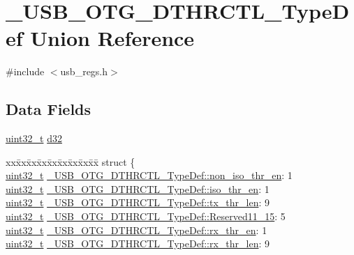\hypertarget{union___u_s_b___o_t_g___d_t_h_r_c_t_l___type_def}{\section{\-\_\-\-U\-S\-B\-\_\-\-O\-T\-G\-\_\-\-D\-T\-H\-R\-C\-T\-L\-\_\-\-Type\-Def Union Reference}
\label{union___u_s_b___o_t_g___d_t_h_r_c_t_l___type_def}
}


{\ttfamily \#include $<$usb\-\_\-regs.\-h$>$}

\subsection*{Data Fields}
\begin{DoxyCompactItemize}
\item 
\hyperlink{stdint_8h_a435d1572bf3f880d55459d9805097f62}{uint32\-\_\-t} \hyperlink{group___u_s_b___o_t_g___d_r_i_v_e_r_ga4c8322898391b3df3f8c2eaaaa831cd6}{d32}
\item 
\begin{tabbing}
xx\=xx\=xx\=xx\=xx\=xx\=xx\=xx\=xx\=\kill
struct \{\\
\>\hyperlink{stdint_8h_a435d1572bf3f880d55459d9805097f62}{uint32\_t} \hyperlink{group___u_s_b___o_t_g___d_r_i_v_e_r_ga437a4ecc78a29535cb600a64f99fdded}{\_USB\_OTG\_DTHRCTL\_TypeDef::non\_iso\_thr\_en}: 1\\
\>\hyperlink{stdint_8h_a435d1572bf3f880d55459d9805097f62}{uint32\_t} \hyperlink{group___u_s_b___o_t_g___d_r_i_v_e_r_ga061c382bbfc6cb270dd9074511b6546b}{\_USB\_OTG\_DTHRCTL\_TypeDef::iso\_thr\_en}: 1\\
\>\hyperlink{stdint_8h_a435d1572bf3f880d55459d9805097f62}{uint32\_t} \hyperlink{group___u_s_b___o_t_g___d_r_i_v_e_r_ga567c6393ecd2b93a7bb261d16f56543a}{\_USB\_OTG\_DTHRCTL\_TypeDef::tx\_thr\_len}: 9\\
\>\hyperlink{stdint_8h_a435d1572bf3f880d55459d9805097f62}{uint32\_t} \hyperlink{group___u_s_b___o_t_g___d_r_i_v_e_r_gaf4fce312a08ead77b5fe741fcff35b5d}{\_USB\_OTG\_DTHRCTL\_TypeDef::Reserved11\_15}: 5\\
\>\hyperlink{stdint_8h_a435d1572bf3f880d55459d9805097f62}{uint32\_t} \hyperlink{group___u_s_b___o_t_g___d_r_i_v_e_r_gabf30ccd0997e6301c6783cd50a71e599}{\_USB\_OTG\_DTHRCTL\_TypeDef::rx\_thr\_en}: 1\\
\>\hyperlink{stdint_8h_a435d1572bf3f880d55459d9805097f62}{uint32\_t} \hyperlink{group___u_s_b___o_t_g___d_r_i_v_e_r_ga17bd381e2313feab5337735207e2a93a}{\_USB\_OTG\_DTHRCTL\_TypeDef::rx\_thr\_len}: 9\\

\end{tabbing}
\end{DoxyCompactItemize}
